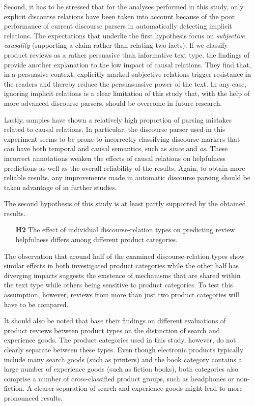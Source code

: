 \documentclass[
    a4paper,%
    12pt,%
    oneside,%
    toc=bibliography,
    final,
]{scrartcl}
\begin{document}
Second, it has to be stressed that for the analyses performed in this study, only explicit discourse relations have been taken into account because of the poor performance of current discourse parsers in automatically detecting implicit relations. The expectations that underlie the first hypothesis focus on \textit{subjective causality} (supporting a claim rather than relating two facts). If we classify product reviews as a rather persuasive than informative text type, the findings of \citet{Kamalski2008} provide another explanation to the low impact of causal relations. They find that, in a persuasive context, explicitly marked subjective relations trigger resistance in the readers and thereby reduce the persuasuasive power of the text. In any case, ignoring implicit relations is a clear limitation of this study that, with the help of more advanced discourse parsers, should be overcome in future research.

Lastly, samples have shown a relatively high proportion of parsing mistakes related to causal relations. In particular, the discourse parser used in this experiment seems to be prone to incorrectly classifying discourse markers that can have both temporal and causal semantics, such as \textit{since} and \textit{as}. These incorrect annotations weaken the effects of causal relations on helpfulness predictions as well as the overall reliability of the results. Again, to obtain more reliable results, any improvements made in automatic discourse parsing should be taken advantage of in further studies.


The second hypothesis of this study is at least partly supported by the obtained results.

\begin{enumerate}[rightmargin=1cm]
\item[\textbf{H2}] The effect of individual discourse-relation types on predicting review helpfulness differs among different product categories.
\end{enumerate}

The observation that around half of the examined discourse-relation types show similar effects in both investigated product categories while the other half has diverging impacts suggests the existence of mechanisms that are shared within the text type while others being sensitive to product categories. To test this assumption, however, reviews from more than just two product categories will have to be compared.

It should also be noted that \citet{MudambiSchuff2010} base their findings on different evaluations of product reviews between product types on the distinction of search and experience goods. The product categories used in this study, however, do not clearly separate between these types. Even though electronic products typically include many search goods (such as printers) and the book category contains a large number of experience goods (such as fiction books), both categories also comprise a number of cross-classified product groups, such as headphones or non-fiction. A clearer separation of search and experience goods might lead to more pronounced results.
\end{document}

